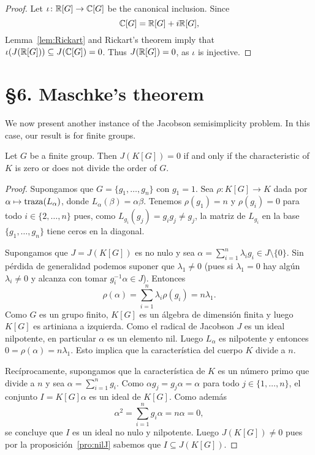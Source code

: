 \begin{proof}
	Let $\iota\colon \mathbb{R}[G]\to\mathbb{C}[G]$ be the canonical inclusion. Since 
	\[
	\mathbb{C}[G]=\mathbb{R}[G]+i\mathbb{R}[G],
	\]
	Lemma~\ref{lem:Rickart} and Rickart's theorem imply that 
	$\iota(J(\mathbb{R}[G]))\subseteq J(\mathbb{C}[G])=0$. Thus $J(\mathbb{R}[G])=0$, as $\iota$ is injective. 
\end{proof}

\section*{\S6. Maschke's theorem}

We now present another instance of the Jacobson semisimplicity problem.
In this case, our result is for finite groups. 

\begin{theorem}[Maschke]
	Let $G$ be a finite group. Then $J(K[G])=0$ if and only 
	if the characteristic of $K$ is zero 
	or does not divide the order of $G$. 
\end{theorem}

\begin{proof}
	Supongamos que $G=\{g_1,\dots,g_n\}$ con $g_1=1$. Sea $\rho\colon K[G]\to
	K$ dada por $\alpha\mapsto\operatorname{traza}(L_{\alpha})$, donde
	$L_{\alpha}(\beta)=\alpha\beta$. Tenemos $\rho(g_1)=n$ y $\rho(g_i)=0$ para
	todo $i\in\{2,\dots,n\}$ pues,  como $L_{g_i}(g_j)=g_{i}g_j\ne g_j$, la
	matriz de $L_{g_i}$ en la base $\{g_1,\dots,g_n\}$ tiene ceros en la
	diagonal.

	Supongamos que $J=J(K[G])$ es no nulo y sea
	$\alpha=\sum_{i=1}^n\lambda_ig_i\in J\setminus\{0\}$. Sin pérdida de
	generalidad podemos suponer que $\lambda_1\ne 0$ (pues si $\lambda_1=0$ hay
	algún $\lambda_i\ne 0$ y alcanza con tomar $g_i^{-1}\alpha\in J$). Entonces
	\[
		\rho(\alpha)=\sum_{i=1}^n \lambda_i\rho(g_i)=n\lambda_1.
	\]
	Como $G$ es un grupo finito, $K[G]$ es un álgebra de dimensión finita y
	luego $K[G]$ es artiniana a izquierda. Como el radical de Jacobson $J$ es
	un ideal nilpotente, en particular $\alpha$ es un elemento nil. Luego
	$L_{\alpha}$ es nilpotente y entonces $0=\rho(\alpha)=n\lambda_1$. Esto
	implica que la característica del cuerpo $K$ divide a $n$. 

	Recíprocamente, supongamos que la característica de $K$ es un número primo
	que divide a $n$ y sea $\alpha=\sum_{i=1}^ng_i$. Como $\alpha
	g_j=g_j\alpha=\alpha$ para todo $j\in\{1,\dots,n\}$, el conjunto
	$I=K[G]\alpha$ es un ideal de $K[G]$. Como además 
	\[
		\alpha^2=\sum_{i=1}^n g_i\alpha=n\alpha=0,
	\]
	se concluye que $I$ es un ideal no nulo y nilpotente. Luego $J(K[G])\ne 0$
	pues por la proposición~\ref{pro:nilJ} sabemos que $I\subseteq J(K[G])$.
\end{proof}

